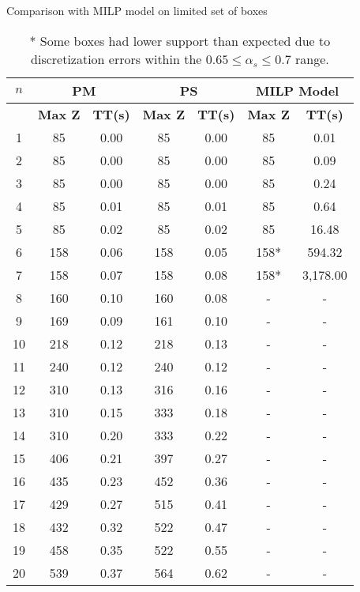 \begin{table}[htbp]
    \centering
    \caption{Comparison with MILP model on limited set of boxes}
    \begin{tabular}{|c|c|c|c|c|c|c|}
    \hline
    \textbf{$n$} & \multicolumn{ 2}{c|}{\textbf{PM}} & \multicolumn{ 2}{c|}{\textbf{PS}} & \multicolumn{ 2}{c|}{\textbf{MILP Model}} \\ \hline
    \multicolumn{1}{|l|}{} & \textbf{Max Z} & \textbf{TT(s)} & \textbf{Max Z} & \textbf{TT(s)} & \textbf{Max Z} & \textbf{TT(s)} \\ \hline
    1 & 85 & 0.00 & 85 & 0.00 & 85 & 0.01 \\ 
    2 & 85 & 0.00 & 85 & 0.00 & 85 & 0.09 \\ 
    3 & 85 & 0.00 & 85 & 0.00 & 85 & 0.24 \\ 
    4 & 85 & 0.01 & 85 & 0.01 & 85 & 0.64 \\ 
    5 & 85 & 0.02 & 85 & 0.02 & 85 & 16.48 \\ 
    6 & 158 & 0.06 & 158 & 0.05 & 158* & 594.32 \\ 
    7 & 158 & 0.07 & 158 & 0.08 & 158* & 3,178.00 \\ \hline
    8 & 160 & 0.10 & 160 & 0.08 & - & - \\ 
    9 & 169 & 0.09 & 161 & 0.10 & - & - \\ 
    10 & 218 & 0.12 & 218 & 0.13 & - & - \\ 
    11 & 240 & 0.12 & 240 & 0.12 & - & - \\ 
    12 & 310 & 0.13 & 316 & 0.16 & - & - \\ 
    13 & 310 & 0.15 & 333 & 0.18 & - & - \\ 
    14 & 310 & 0.20 & 333 & 0.22 & - & - \\ 
    15 & 406 & 0.21 & 397 & 0.27 & - & - \\ 
    16 & 435 & 0.23 & 452 & 0.36 & - & - \\ 
    17 & 429 & 0.27 & 515 & 0.41 & - & - \\ 
    18 & 432 & 0.32 & 522 & 0.47 & - & - \\ 
    19 & 458 & 0.35 & 522 & 0.55 & - & - \\ 
    20 & 539 & 0.37 & 564 & 0.62 & - & - \\ \hline
    \end{tabular}
    \label{exp:model}
    \caption*{* Some boxes had lower support than expected due to discretization errors within the $ 0.65 \le \alpha_s \le 0.7$ range.}
    \end{table}
